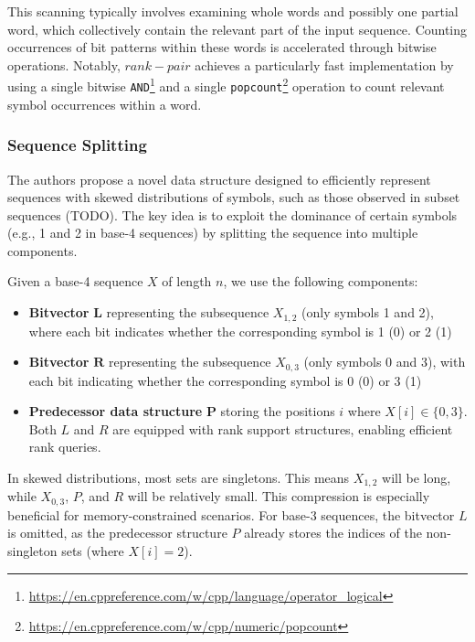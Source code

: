 
\noindent This scanning typically involves examining whole words and possibly one partial word, which collectively contain the relevant part of the input sequence. Counting occurrences of bit patterns within these words is accelerated through bitwise operations. Notably, $rank-pair$ achieves a particularly fast implementation by using a single bitwise \texttt{AND}\footnote{\url{https://en.cppreference.com/w/cpp/language/operator_logical}} and a single \texttt{popcount}\footnote{\url{https://en.cppreference.com/w/cpp/numeric/popcount}} operation to count relevant symbol occurrences within a word.

\subsubsection{Sequence Splitting}

The authors propose a novel data structure designed to efficiently represent sequences with skewed distributions of symbols, such as those observed in subset sequences (TODO). The key idea is to exploit the dominance of certain symbols (e.g., 1 and 2 in base-4 sequences) by splitting the sequence into multiple components.

\noindent Given a base-4 sequence \(X\) of length \(n\), we use the following components:
\begin{itemize}
    \item \textbf{Bitvector} \(\mathbf{L}\) representing the subsequence \(X_{1,2}\) (only symbols 1 and 2), where each bit indicates whether the corresponding symbol is 1 (0) or 2 (1)
    \item \textbf{Bitvector} \(\mathbf{R}\) representing the subsequence \(X_{0,3}\) (only symbols 0 and 3), with each bit indicating whether the corresponding symbol is 0 (0) or 3 (1)
    \item \textbf{Predecessor data structure} \(\mathbf{P}\) storing the positions \(i\) where \(X[i] \in \{0, 3\}\). Both \(L\) and \(R\) are equipped with rank support structures, enabling efficient rank queries.
\end{itemize}

\noindent In skewed distributions, most sets are singletons. This means \(X_{1,2}\) will be long, while \(X_{0,3}\), $P$, and $R$ will be relatively small. This compression is especially beneficial for memory-constrained scenarios. For base-3 sequences, the bitvector \(L\) is omitted, as the predecessor structure \(P\) already stores the indices of the non-singleton sets (where \(X[i] = 2\)).

